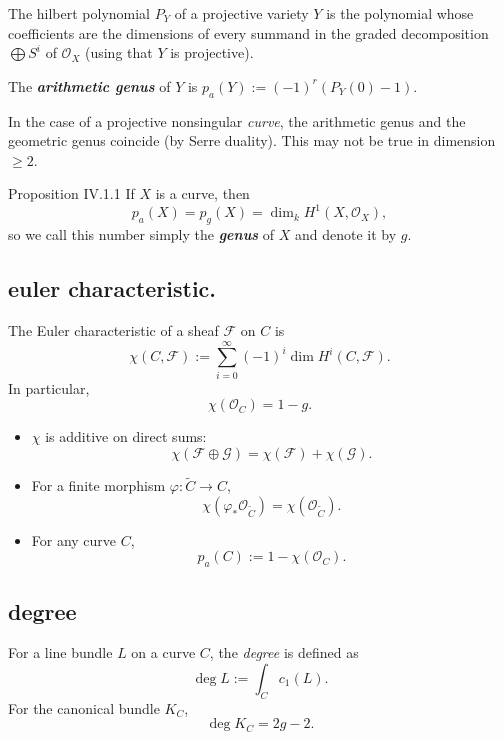 \begin{defn}[p. 54]\leavevmode
The hilbert polynomial \(P_Y\) of a projective variety  \(Y\) is the polynomial whose coefficients are the dimensions of every summand in the graded decomposition \(\bigoplus S^i\) of \(\mathcal{O}_X\) (using that \(Y\) is projective).

The \textit{\textbf{arithmetic genus}} of \(Y\) is \(p_a(Y):=(-1)^{r}(P_Y(0)-1).\)
\end{defn}

\begin{remark}\leavevmode
	In the case of a projective nonsingular \textit{curve}, the arithmetic genus and the geometric genus coincide (by Serre duality). This may not be true in dimension \(\geq 2\).
\end{remark}

\begin{thing4}{Proposition IV.1.1}\label{prop:IV.1.1}\leavevmode
If \(X\) is a curve, then
\[p_a(X)=p_g(X)=\dim_kH^{1}(X,\mathcal{O}_X),\]
so we call this number simply the \textit{\textbf{genus}} of \(X\) and denote it by \(g\).
\end{thing4}




\subsection{euler characteristic.}
The Euler characteristic of a sheaf \( \mathcal{F} \) on \( C \) is
\[
\chi(C, \mathcal{F}) := \sum_{i=0}^\infty (-1)^i \dim H^i(C, \mathcal{F}).
\]
In particular,
\[
\chi(\mathcal{O}_C) = 1 - g.
\]
\begin{itemize}
  \item \(\chi\) is additive on direct sums:
  \[
  \chi(\mathcal{F} \oplus \mathcal{G}) = \chi(\mathcal{F}) + \chi(\mathcal{G}).
  \]
  \item For a finite morphism \( \varphi: \widetilde{C} \to C \),
  \[
  \chi(\varphi_*\mathcal{O}_{\widetilde{C}}) = \chi(\mathcal{O}_{\widetilde{C}}).
  \]
  \item For any curve \( C \),
  \[
  p_a(C) := 1 - \chi(\mathcal{O}_C).
  \]
\end{itemize}

\subsection{degree}
For a line bundle \( L \) on a curve \( C \), the \emph{degree} is defined as
\[
\deg L := \int_C c_1(L).
\]
For the canonical bundle \( K_C \),
\[
\deg K_C = 2g - 2.
\]

